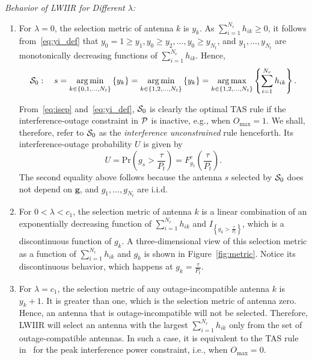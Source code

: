 \documentclass[12pt,draftcls,peerreview,onecolumn]{IEEEtran}
\newcommand{\brac}[1]{\left({#1}\right)}
\newcommand{\cbrac}[1]{\left\{{#1}\right\}}
\newcommand{\indic}[1]{I_{\cbrac{#1}}}
\newcommand{\ie}{{i.e.}}
\newcommand{\eg}{{e.g.}}
\newcommand{\prob}[1]{\text{Pr}\brac{#1}}
\DeclareMathOperator*{\argmin}{arg\,min}
\DeclareMathOperator*{\argmax}{arg\,max}
\newcommand{\nx}{{0}}
\newcommand{\lam}{\lambda}
\newcommand{\Nt}{{N_t}}
\newcommand{\Nr}{{N_r}}
\newcommand{\Pt}{{P_t}}
\newcommand{\such}{h}
\newcommand{\puch}{g}
\newcommand{\hk}[1]{{\such_{#1}}}
\newcommand{\gk}[1]{{\puch_{#1}}}
\newcommand{\g}{\mathbf{\puch}}
\newcommand{\outmax}{O_{\text{max}}}
\newcommand{\itau}{\tau}
\newcommand{\cone}{c_{1}}
\newcommand{\taubypt}{\frac{\itau}{\Pt}}
\newcommand{\gkgrtaubypt}[1]{{\gk{#1}}>\taubypt}
\newcommand{\yk}[1]{y_{#1}}
\newcommand{\un}{U}
\newcommand{\allopts}{\left\{\nx,1,\ldots,\Nt\right\}}
\newcommand{\antopts}{\left\{1,2,\ldots,\Nt\right\}}
\newcommand{\optproblem}{{\cal P}}
\newcommand{\caluncons}{{\cal S_{\text{0}}}}
\newcommand{\sumnr}{\sum_{i=1}^{\Nr}}
\begin{document}
{\em Behavior of LWIIR for Different $\lam$:}
\begin{enumerate}
\item For $\lam=0$, the selection metric of antenna $k$ is $\yk{k}$. As $\sumnr\hk{ik}\geq 0$, it follows from~\eqref{eq:yi_def} that $\yk{0}=1\geq\yk{1},\yk{0}\geq\yk{2},\ldots,\yk{0}\geq\yk{\Nt}$, and   $\yk{1},\ldots,\yk{\Nt}$ are monotonically decreasing functions of $\sumnr\hk{ik}$. Hence, 
\begin{equation}
\caluncons:\quad s=\argmin\limits_{k\in\allopts} \left\{ \yk{k} \right\} = \argmin\limits_{k\in\antopts} \left\{ \yk{k} \right\} = \argmax\limits_{k\in\antopts} \left\{\sumnr \hk{ik} \right\}.
\label{eq:uncons_simple}
\end{equation}

From~\eqref{eq:isep} and~\eqref{eq:yi_def}, $\caluncons$ is clearly the optimal TAS rule if the interference-outage constraint in $\optproblem$ is inactive, \eg, when $\outmax=1$. We shall, therefore, refer to $\caluncons$ as the {\em interference unconstrained} rule henceforth. Its interference-outage probability $\un$ is given by
%
\begin{equation}
\un= \prob{\gk{s}>\taubypt}= F^c_{\gk{1}}\!\!\left({\taubypt}\right) .
\label{eq:uncomsoutage}
\end{equation}
%
The second equality above follows because the antenna $s$ selected by $\caluncons$ does not depend on $\g$, and $\gk{1},\ldots,\gk{\Nt}$ are i.i.d. 

\item For $0<\lam<\cone$, the selection metric of antenna $k$ is a linear combination of  an exponentially decreasing function of $\sumnr\hk{ik}$ and $\indic{\gkgrtaubypt{k}}$, which is a discontinuous function of $\gk{k}$. A three-dimensional view of this selection metric as a function of $\sumnr\hk{ik}$ and $\gk{k}$ is shown in Figure~\ref{fig:metric}. Notice its discontinuous behavior, which happens at $\gk{k}=\taubypt$. 

\item For $\lam=\cone$, the selection metric of any outage-incompatible antenna $k$ is  $\yk{k}+1$. It is greater than one, which is the selection metric of antenna zero. Hence, an antenna that is outage-incompatible will not be selected. Therefore, LWIIR will select an antenna with the largest $\sumnr\hk{ik}$ only from the set of outage-compatible antennas. In such a case, it is equivalent to the TAS rule in~\cite{Hanif_2015_globecom}  for the peak interference power constraint, \ie, when $\outmax=0$.


\end{enumerate}
\end{document}

